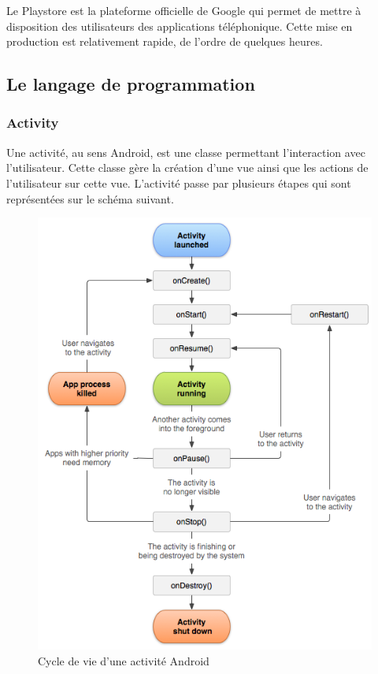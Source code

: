 Le Playstore est la plateforme officielle de Google qui permet de mettre à disposition des utilisateurs des applications téléphonique. Cette mise en production est relativement rapide, de l'ordre de quelques heures.

\subsection{Le langage de programmation}

\subsubsection{Activity}

Une activité, au sens Android, est une classe permettant l’interaction avec l'utilisateur. Cette classe gère la création d'une vue ainsi que les actions de l'utilisateur sur cette vue. L'activité passe par plusieurs étapes qui sont représentées sur le schéma suivant.

\begin{figure}[!h]
	\centering
	\includegraphics[scale=0.6]{img/activity_lifecycle.png}
	\caption{\label{activity_lifecycle} Cycle de vie d'une activité Android}
\end{figure}

